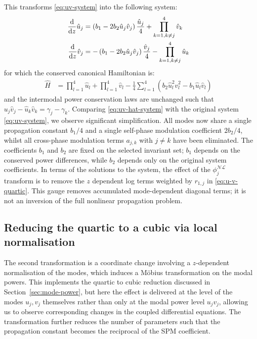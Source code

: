 \documentclass[11pt,a4paper]{article}
\numberwithin{equation}{section}
\begin{document}
This transforms \eqref{eq:uv-system} into the following system:
\begin{align}
\frac{\mathrm{d}}{\mathrm{d}z} \hat{u}_j &= \left(b_1 - 2b_2\hat{u}_j \hat{v}_j \right) \frac{\hat{u}_j}{4} + \prod\limits_{k=1, k \ne j}^{4} \hat{v}_k \notag \\
\frac{\mathrm{d}}{\mathrm{d}z} \hat{v}_j &= -\left(b_1 - 2b_2\hat{u}_j \hat{v}_j\right) \frac{\hat{v}_j}{4} - \prod\limits_{k=1, k \ne j}^{4} \hat{u}_k \label{eq:uv-hat-system}
\end{align}
for which the conserved canonical Hamiltonian is:
\begin{align}
\hat{H} &= \prod_{l=1}^{4} \hat{u}_l + \prod_{l=1}^{4} \hat{v}_l - \frac{1}{4}\sum_{l=1}^{4} \left(b_2 \hat{u}^{2}_l \hat{v}^{2}_l  - b_1 \hat{u}_l \hat{v}_l \right)
\end{align}
and the intermodal power conservation laws are unchanged such that $\hat{u}_j \hat{v}_j - \hat{u}_k \hat{v}_k = \gamma_j - \gamma_k$.
Comparing \eqref{eq:uv-hat-system} with the original system \eqref{eq:uv-system}, we observe significant simplification.
All modes now share a single propagation constant $b_1/4$ and a single self-phase modulation coefficient $2b_2/4$, whilst all cross-phase modulation terms $a_{j,k}$ with $j \ne k$ have been eliminated.
The coefficients $b_1$ and $b_2$ are fixed on the selected invariant set; $b_1$ depends on the conserved power differences, while $b_2$ depends only on the original system coefficients.
In terms of the solutions to the system, the effect of the $\phi_j^{\mathcal{NL}}$ transform is to remove the $z$ dependent log terms weighted by $r_{1,j}$ in \eqref{eq:u-v-quartic}.
This gauge removes accumulated mode-dependent diagonal terms; it is not an inversion of the full nonlinear propagation problem.


\subsection{Reducing the quartic to a cubic via local normalisation}\label{subsec:bar-coords}

The second transformation is a coordinate change involving a $z$-dependent normalisation of the modes, which induces a M\"obius transformation on the modal powers.
This implements the quartic to cubic reduction discussed in Section~\ref{sec:mode-power}, but here the effect is delivered at the level of the modes $u_j, v_j$ themselves rather than only at the modal power level $u_j v_j$, allowing us to observe corresponding changes in the coupled differential equations.
The transformation further reduces the number of parameters such that the propagation constant becomes the reciprocal of the SPM coefficient.
\end{document}
